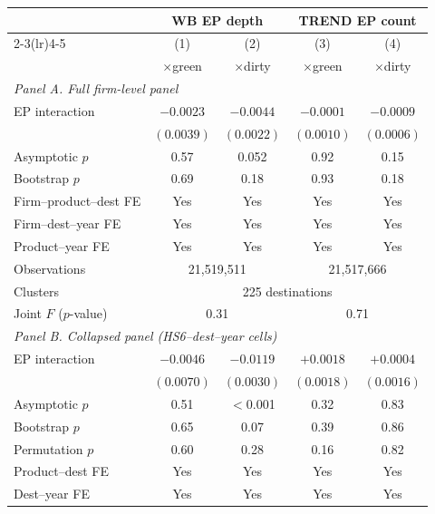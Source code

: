 \small
\begin{threeparttable}
\begin{tabular}{lcccc}
\toprule
 & \multicolumn{2}{c}{WB EP depth} & \multicolumn{2}{c}{TREND EP count} \\
\cmidrule(lr){2-3}\cmidrule(lr){4-5}
 & (1) & (2) & (3) & (4) \\
 & $\times$green & $\times$dirty & $\times$green & $\times$dirty \\
\midrule
\multicolumn{5}{l}{\textit{Panel A. Full firm-level panel}} \\
\addlinespace
EP interaction & $-0.0023$ & $-0.0044$ & $-0.0001$ & $-0.0009$ \\
 & $(0.0039)$ & $(0.0022)$ & $(0.0010)$ & $(0.0006)$ \\
\quad Asymptotic $p$ & 0.57 & 0.052 & 0.92 & 0.15 \\
\quad Bootstrap $p$ & 0.69 & 0.18 & 0.93 & 0.18 \\
\addlinespace
Firm--product--dest FE & Yes & Yes & Yes & Yes \\
Firm--dest--year FE & Yes & Yes & Yes & Yes \\
Product--year FE & Yes & Yes & Yes & Yes \\
Observations & \multicolumn{2}{c}{21,519,511} & \multicolumn{2}{c}{21,517,666} \\
Clusters & \multicolumn{4}{c}{225 destinations} \\
Joint $F$ ($p$-value) & \multicolumn{2}{c}{0.31} & \multicolumn{2}{c}{0.71} \\
\midrule
\multicolumn{5}{l}{\textit{Panel B. Collapsed panel (HS6--dest--year cells)}} \\
\addlinespace
EP interaction & $-0.0046$ & $-0.0119$\sym{***} & $+0.0018$ & $+0.0004$ \\
 & $(0.0070)$ & $(0.0030)$ & $(0.0018)$ & $(0.0016)$ \\
\quad Asymptotic $p$ & 0.51 & $<$0.001 & 0.32 & 0.83 \\
\quad Bootstrap $p$ & 0.65 & 0.07 & 0.39 & 0.86 \\
\quad Permutation $p$ & 0.60 & 0.28 & 0.16 & 0.82 \\
\addlinespace
Product--dest FE & Yes & Yes & Yes & Yes \\
Dest--year FE & Yes & Yes & Yes & Yes \\

\end{tabular}
\end{threeparttable}
